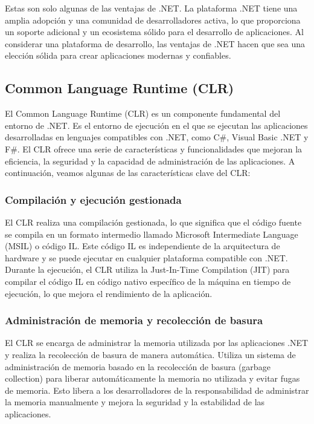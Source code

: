 \documentclass[executivepaper]{article}
\begin{document}
Estas son solo algunas de las ventajas de .NET. La plataforma .NET tiene una amplia adopción y una comunidad de desarrolladores activa, lo que proporciona un soporte adicional y un ecosistema sólido para el desarrollo de aplicaciones. Al considerar una plataforma de desarrollo, las ventajas de .NET hacen que sea una elección sólida para crear aplicaciones modernas y confiables.

\subsection{Common Language Runtime (CLR)}

El Common Language Runtime (CLR) es un componente fundamental del entorno de .NET. Es el entorno de ejecución en el que se ejecutan las aplicaciones desarrolladas en lenguajes compatibles con .NET, como C\#, Visual Basic .NET y F\#. El CLR ofrece una serie de características y funcionalidades que mejoran la eficiencia, la seguridad y la capacidad de administración de las aplicaciones. A continuación, veamos algunas de las características clave del CLR:

\subsubsection*{Compilación y ejecución gestionada}
El CLR realiza una compilación gestionada, lo que significa que el código fuente se compila en un formato intermedio llamado Microsoft Intermediate Language (MSIL) o código IL. Este código IL es independiente de la arquitectura de hardware y se puede ejecutar en cualquier plataforma compatible con .NET. Durante la ejecución, el CLR utiliza la Just-In-Time Compilation (JIT) para compilar el código IL en código nativo específico de la máquina en tiempo de ejecución, lo que mejora el rendimiento de la aplicación.

\subsubsection*{Administración de memoria y recolección de basura}
El CLR se encarga de administrar la memoria utilizada por las aplicaciones .NET y realiza la recolección de basura de manera automática. Utiliza un sistema de administración de memoria basado en la recolección de basura (garbage collection) para liberar automáticamente la memoria no utilizada y evitar fugas de memoria. Esto libera a los desarrolladores de la responsabilidad de administrar la memoria manualmente y mejora la seguridad y la estabilidad de las aplicaciones.
\end{document}
